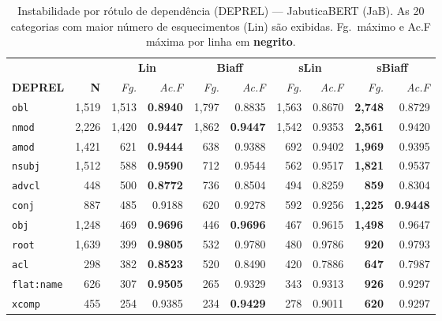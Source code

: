 \clearpage
\begin{table}[p]
\centering
\caption{Instabilidade por r\'otulo de depend\^encia (DEPREL) --- JabuticaBERT (JaB).
As 20 categorias com maior n\'umero de esquecimentos (Lin) s\~ao exibidas.
Fg.\ m\'aximo e Ac.F m\'axima por linha em \textbf{negrito}.}
\label{tab:instab-jab-deprel}
\begingroup
\scriptsize\setlength{\tabcolsep}{2pt}\renewcommand{\arraystretch}{1.25}%
\begin{tabular}{l r| r r| r r| r r| r r}
\toprule
\multicolumn{2}{c|}{}
  & \multicolumn{2}{c|}{\textbf{Lin}}
  & \multicolumn{2}{c|}{\textbf{Biaff}}
  & \multicolumn{2}{c|}{\textbf{sLin}}
  & \multicolumn{2}{c}{\textbf{sBiaff}} \\
\textbf{DEPREL} & \textbf{N}
  & \textit{Fg.} & \textit{Ac.F}
  & \textit{Fg.} & \textit{Ac.F}
  & \textit{Fg.} & \textit{Ac.F}
  & \textit{Fg.} & \textit{Ac.F} \\
\cmidrule(lr){3-4}\cmidrule(lr){5-6}\cmidrule(lr){7-8}\cmidrule(lr){9-10}
  \texttt{obl} & 1,519 & 1,513 & \textbf{0.8940} & 1,797 & 0.8835 & 1,563 & 0.8670 & \textbf{2,748} & 0.8729 \\
  \texttt{nmod} & 2,226 & 1,420 & \textbf{0.9447} & 1,862 & \textbf{0.9447} & 1,542 & 0.9353 & \textbf{2,561} & 0.9420 \\
  \texttt{amod} & 1,421 & 621 & \textbf{0.9444} & 638 & 0.9388 & 692 & 0.9402 & \textbf{1,969} & 0.9395 \\
  \texttt{nsubj} & 1,512 & 588 & \textbf{0.9590} & 712 & 0.9544 & 562 & 0.9517 & \textbf{1,821} & 0.9537 \\
  \texttt{advcl} & 448 & 500 & \textbf{0.8772} & 736 & 0.8504 & 494 & 0.8259 & \textbf{859} & 0.8304 \\
  \texttt{conj} & 887 & 485 & 0.9188 & 620 & 0.9278 & 592 & 0.9256 & \textbf{1,225} & \textbf{0.9448} \\
  \texttt{obj} & 1,248 & 469 & \textbf{0.9696} & 446 & \textbf{0.9696} & 467 & 0.9615 & \textbf{1,498} & 0.9647 \\
  \texttt{root} & 1,639 & 399 & \textbf{0.9805} & 532 & 0.9780 & 480 & 0.9786 & \textbf{920} & 0.9793 \\
  \texttt{acl} & 298 & 382 & \textbf{0.8523} & 520 & 0.8490 & 420 & 0.7886 & \textbf{647} & 0.7987 \\
  \texttt{flat\!:\!name} & 626 & 307 & \textbf{0.9505} & 265 & 0.9329 & 343 & 0.9313 & \textbf{926} & 0.9297 \\
  \texttt{xcomp} & 455 & 254 & 0.9385 & 234 & \textbf{0.9429} & 278 & 0.9011 & \textbf{620} & 0.9297 \\

\end{tabular}
\end{table}
